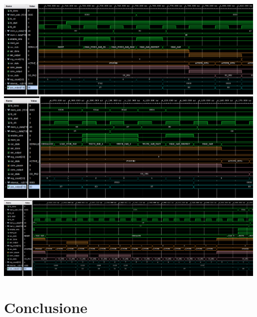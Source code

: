 \documentclass[a4paper]{report}
\begin{document}
\includegraphics[scale = 0.25]{schematics/Caricamento words.png}\\
\includegraphics[scale = 0.25]{schematics/Caricamento in ram.png}\\
\includegraphics[scale = 0.25]{schematics/Byte elabora.png}



\chapter{Conclusione}
\end{document}
